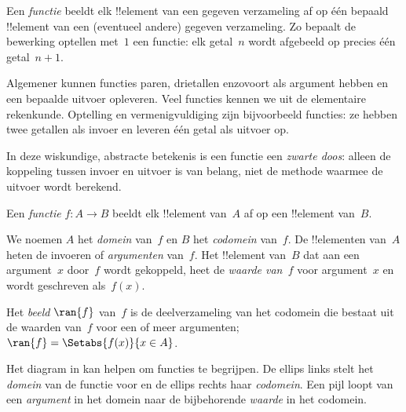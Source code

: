 \documentclass[openany]{memoir}
\begin{document}
\begingroup
\def\olfilename{OLP-0021}
\def\olfilepath{content/sets-functions-relations/functions/}
\hypertarget{unit-OLP-0021}{}




\begin{explain}
Een \emph{functie} beeldt elk !!{element} van een gegeven verzameling af op
één bepaald !!{element} van een (eventueel andere) gegeven verzameling. Zo
bepaalt de bewerking optellen met~$1$ een functie:
elk getal~$n$ wordt afgebeeld op precies één getal~$n+1$.
  
Algemener kunnen functies paren, drietallen enzovoort als argument hebben en
een bepaalde uitvoer opleveren. Veel functies kennen we uit de elementaire
rekenkunde. Optelling en vermenigvuldiging zijn bijvoorbeeld functies: ze
hebben twee getallen als invoer en leveren één getal als uitvoer op.

In deze wiskundige, abstracte betekenis is een functie een \emph{zwarte
doos}: alleen de koppeling tussen invoer en uitvoer is van belang, niet de
methode waarmee de uitvoer wordt berekend.
\end{explain}

\begin{defn}[Functie]
Een \emph{functie} $f \colon A \to B$ beeldt elk !!{element} van~$A$ af
op een !!{element} van~$B$.

We noemen $A$ het \emph{domein} van~$f$ en $B$ het \emph{codomein}
van~$f$. De !!{element}en van~$A$ heten de invoeren of \emph{argumenten}
van~$f$. Het !!{element} van~$B$ dat aan een argument~$x$ door~$f$ wordt
gekoppeld, heet de \emph{waarde van~$f$} voor argument~$x$ en wordt
geschreven als~$f(x)$.

Het \emph{beeld} $\ran{f}$ van~$f$ is de deelverzameling van het codomein
die bestaat uit de waarden van~$f$ voor een of meer argumenten; $\ran{f} =
\Setabs{f(x)}{x \in A}$.
\end{defn}

Het diagram in  kan helpen om functies te begrijpen. De
ellips links stelt het \emph{domein} van de functie voor en de ellips rechts
haar \emph{codomein}. Een pijl loopt van een \emph{argument} in het domein
naar de bijbehorende \emph{waarde} in het codomein.
\end{document}
